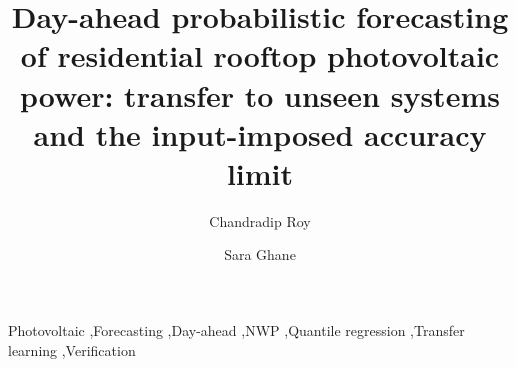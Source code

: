 \documentclass[preprint,review,12pt,authoryear]{elsarticle}
\newif\ifwithsupp
\begin{document}
\begin{frontmatter}

\title{Day-ahead probabilistic forecasting of residential rooftop photovoltaic power: transfer to unseen systems and the input-imposed accuracy limit}

\author[mit]{Chandradip Roy}

\author[dtsc]{Sara Ghane}



\begin{abstract}

\end{abstract}


\begin{highlights}

\end{highlights}

\begin{keyword}
Photovoltaic \sep Forecasting \sep Day-ahead \sep NWP \sep Quantile regression \sep Transfer learning \sep Verification
\end{keyword}

\end{frontmatter}











\FloatBarrier



\ifwithsupp
\clearpage
\section*{Supplementary material}

\fi
\end{document}
